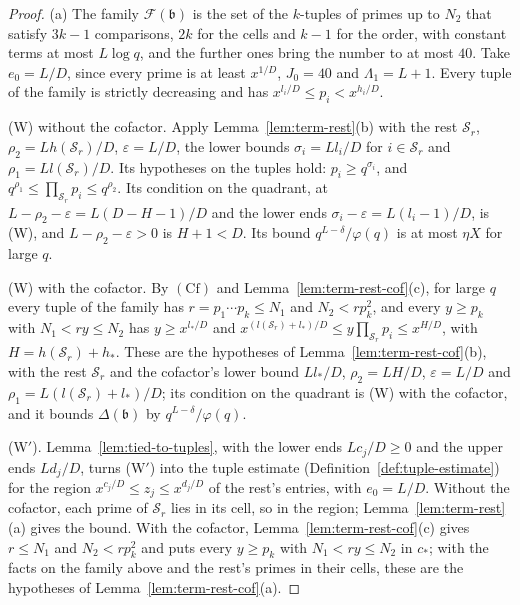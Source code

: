 \documentclass[11pt]{article}
\theoremstyle{definition}
\begin{document}
\begin{proof}
(a) The family $\mathcal F(\mathfrak b)$ is the set of the $k$-tuples of primes up to $N_2$ that satisfy $3k - 1$
comparisons, $2k$ for the cells and $k - 1$ for the order, with constant terms at most $L \log q$, and the further ones
bring the number to at most $40$. Take $e_0 = L/D$, since every prime is at least $x^{1/D}$, $J_0 = 40$ and $\Lambda_1 =
L + 1$. Every tuple of the family is strictly decreasing and has $x^{l_i/D} \le p_i < x^{h_i/D}$.

(W) without the cofactor. Apply Lemma~\ref{lem:term-rest}(b) with the rest $\mathcal S_r$, $\rho_2 = Lh(\mathcal
S_r)/D$, $\varepsilon = L/D$, the lower bounds $\sigma_i = Ll_i/D$ for $i \in \mathcal S_r$ and $\rho_1 = Ll(\mathcal
S_r)/D$. Its hypotheses on the tuples hold: $p_i \ge q^{\sigma_i}$, and $q^{\rho_1} \le \prod_{\mathcal S_r} p_i \le
q^{\rho_2}$. Its condition on the quadrant, at $L - \rho_2 - \varepsilon = L(D - H - 1)/D$ and the lower ends
$\sigma_i - \varepsilon = L(l_i - 1)/D$, is (W), and $L - \rho_2 - \varepsilon > 0$ is $H + 1 < D$. Its bound
$q^{L - \delta}/\varphi(q)$ is at most $\eta X$ for large $q$.

(W) with the cofactor. By $(\mathrm{Cf})$ and Lemma~\ref{lem:term-rest-cof}(c), for large $q$ every tuple of the family
has $r =
p_1 \cdots p_k \le N_1$ and $N_2 < r p_k^2$, and every $y \ge p_k$ with $N_1 < ry \le N_2$ has $y \ge x^{l_*/D}$ and
$x^{(l(\mathcal S_r) + l_*)/D} \le y \prod_{\mathcal S_r} p_i \le x^{H/D}$, with $H = h(\mathcal S_r) + h_*$. These are
the hypotheses of Lemma~\ref{lem:term-rest-cof}(b), with the rest $\mathcal S_r$ and the cofactor's lower bound
$Ll_*/D$,
$\rho_2 = LH/D$, $\varepsilon = L/D$ and $\rho_1 = L(l(\mathcal S_r) + l_*)/D$; its condition on the quadrant is (W)
with the cofactor, and it bounds $\Delta(\mathfrak b)$ by $q^{L - \delta}/\varphi(q)$.

(W$'$). Lemma~\ref{lem:tied-to-tuples}, with the lower ends $Lc_j/D \ge 0$ and the upper ends $Ld_j/D$, turns (W$'$)
into the tuple estimate (Definition~\ref{def:tuple-estimate}) for the region $x^{c_j/D} \le z_j \le x^{d_j/D}$ of the
rest's entries, with $e_0 = L/D$. Without the cofactor, each prime of $\mathcal S_r$ lies in its cell, so in the region;
Lemma~\ref{lem:term-rest}(a) gives the bound. With the cofactor, Lemma~\ref{lem:term-rest-cof}(c) gives $r \le N_1$
and $N_2 < r p_k^2$ and puts every $y \ge p_k$ with $N_1 < ry \le N_2$ in $c_*$; with the facts on the family above and
the rest's primes in their cells, these are the hypotheses of Lemma~\ref{lem:term-rest-cof}(a).


\end{proof}
\end{document}
